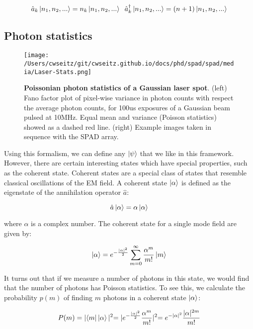 \begin{equation*}
\hat{a}_k \ket{n_1, n_2, ...} = n_k \ket{n_1, n_2, ...} \;\;
\hat{a}_k^\dagger \ket{n_1, n_2, ...} = (n+1) \ket{n_1, n_2, ...}
\end{equation*}

\subsection{Photon statistics}

\begin{figure*}[t]
\centering
\texttt{[image: /Users/cwseitz/git/cwseitz.github.io/docs/phd/spad/spad/media/Laser-Stats.png]}
\caption{\textbf{Poissonian photon statistics of a Gaussian laser spot}. (left) Fano factor plot of pixel-wise variance in photon counts with respect the average photon counts, for 100us exposures of a Gaussian beam pulsed at 10MHz. Equal mean and variance (Poisson statistics) showed as a dashed red line. (right) Example images taken in sequence with the SPAD array.}
\label{fig:fig29}
\end{figure*}    

Using this formalism, we can define any $\ket{\psi}$ that we like in this framework. However, there are certain interesting states which have special properties, such as the coherent state. Coherent states are a special class of states that resemble classical oscillations of the EM field. A coherent state $\ket{\alpha}$ is defined as the eigenstate of the annihilation operator $\hat{a}$:

\begin{equation*}
\hat{a} \ket{\alpha} = \alpha \ket{\alpha}
\end{equation*}

where $\alpha$ is a complex number. The coherent state for a single mode field are given by:

\begin{equation*}
\ket{\alpha} = e^{-\frac{\lvert\alpha\lvert^2}{2}} \sum_{m=0}^\infty \frac{\alpha^m}{m!} \ket{m}
\end{equation*}

It turns out that if we measure a number of photons in this state, we would find that the number of photons has Poisson statistics. To see this, we calculate the probability $p(m)$ of finding $m$ photons in a coherent state $\ket{\alpha}$:

\begin{equation*}
P(m) = \lvert \bra{m} \ket{\alpha} \lvert^2 = \lvert e^{-\frac{\lvert\alpha\lvert^2}{2}} \frac{\alpha^m}{m!} \lvert^2 = e^{-\lvert\alpha\lvert^2} \frac{\lvert\alpha\lvert^{2m}}{m!}
\end{equation*}

